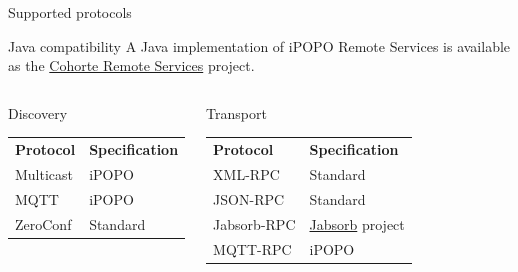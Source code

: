 \begin{frame}{Supported protocols}
\begin{exampleblock}{Java compatibility}
A Java implementation of iPOPO Remote Services is available as the \href{https://github.com/cohorte/cohorte-remote-services}{Cohorte Remote Services} project.
\end{exampleblock}

\begin{small}
\begin{columns}[t,onlytextwidth]
\begin{block}{Discovery}
\centering
\begin{tabular}{ll}
\textbf{Protocol} & \textbf{Specification}\\
Multicast & iPOPO\\
MQTT & iPOPO\\
ZeroConf & Standard\\
\end{tabular}
\end{block}

\begin{block}{Transport}
\centering
\begin{tabular}{ll}
\textbf{Protocol} & \textbf{Specification}\\
XML-RPC & Standard\\
JSON-RPC & Standard\\
Jabsorb-RPC & \href{https://code.google.com/archive/p/jabsorb/}{Jabsorb} project\\
MQTT-RPC & iPOPO \\
\end{tabular}
\end{block}
\end{columns}
\end{small}
\end{frame}

